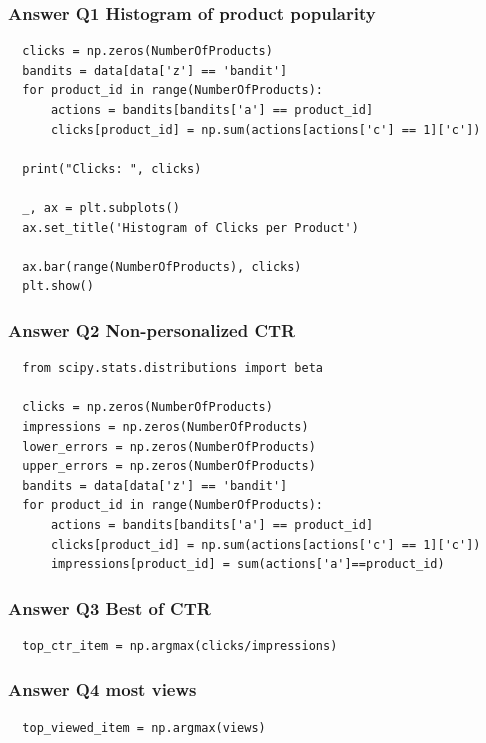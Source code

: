 




\begin{frame}[fragile]
  \frametitle{Answer Q1 Histogram of product popularity}
\begin{small}
\begin{verbatim}
  clicks = np.zeros(NumberOfProducts)
  bandits = data[data['z'] == 'bandit']
  for product_id in range(NumberOfProducts):
      actions = bandits[bandits['a'] == product_id]
      clicks[product_id] = np.sum(actions[actions['c'] == 1]['c'])
      
  print("Clicks: ", clicks)
  
  _, ax = plt.subplots()
  ax.set_title('Histogram of Clicks per Product')
  
  ax.bar(range(NumberOfProducts), clicks)
  plt.show()
\end{verbatim}
\end{small}
\end{frame}


\begin{frame}[fragile]
  \frametitle{Answer Q2 Non-personalized CTR}
\begin{tiny}
\begin{verbatim}
  from scipy.stats.distributions import beta

  clicks = np.zeros(NumberOfProducts)
  impressions = np.zeros(NumberOfProducts)
  lower_errors = np.zeros(NumberOfProducts)
  upper_errors = np.zeros(NumberOfProducts)
  bandits = data[data['z'] == 'bandit']
  for product_id in range(NumberOfProducts):
      actions = bandits[bandits['a'] == product_id]
      clicks[product_id] = np.sum(actions[actions['c'] == 1]['c'])
      impressions[product_id] = sum(actions['a']==product_id)
\end{verbatim}
\end{tiny}
\end{frame}

\begin{frame}[fragile]
  \frametitle{Answer Q3 Best of CTR}
\begin{verbatim}
  top_ctr_item = np.argmax(clicks/impressions)
\end{verbatim}
\end{frame}


\begin{frame}[fragile]
  \frametitle{Answer Q4 most views}
\begin{verbatim}
  top_viewed_item = np.argmax(views)
\end{verbatim}
\end{frame}




